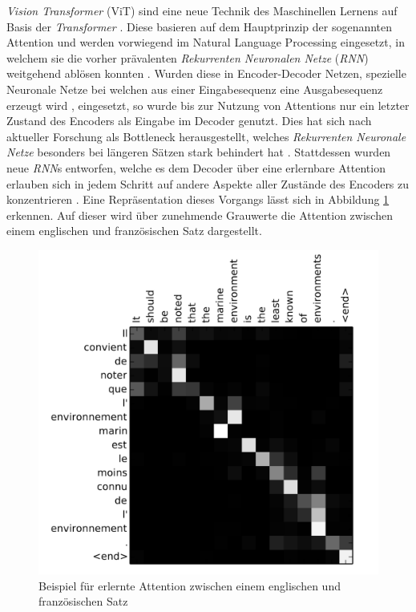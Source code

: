 \documentclass[twoside,a4paper]{IEEEtran}
\begin{document}
\emph{Vision Transformer} (ViT) sind eine neue Technik des Maschinellen Lernens auf Basis der \emph{Transformer} \cite{TRANSFORMERS}. Diese basieren auf dem Hauptprinzip der sogenannten Attention und werden vorwiegend im Natural Language Processing eingesetzt, in welchem sie die vorher prävalenten \emph{Rekurrenten Neuronalen Netze} (\emph{RNN}) weitgehend ablösen konnten \cite{TRANSFORMERS}. Wurden diese in Encoder-Decoder Netzen, spezielle Neuronale Netze bei welchen aus einer Eingabesequenz eine Ausgabesequenz erzeugt wird \cite[S.388-389]{MACHINE_LEARNING}, eingesetzt, so wurde bis zur Nutzung von Attentions nur ein letzter Zustand des Encoders als Eingabe im Decoder genutzt. Dies hat sich nach aktueller Forschung als Bottleneck herausgestellt, welches \emph{Rekurrenten Neuronale Netze} besonders bei längeren Sätzen stark behindert hat \cite[S.2]{TRANSFORMERS}. Stattdessen wurden neue \emph{RNN}s entworfen, welche es dem Decoder über eine erlernbare Attention erlauben sich in jedem Schritt auf andere Aspekte aller Zustände des Encoders zu konzentrieren \cite[S.4]{RNN_ATTENTION}. Eine Repräsentation dieses Vorgangs lässt sich in Abbildung \ref{bildAttention} erkennen. Auf dieser wird über zunehmende Grauwerte die Attention zwischen einem englischen und französischen Satz dargestellt.

\begin{figure}[!htb]
	\includegraphics[width=\columnwidth]{attention_visualized}
	\caption{Beispiel für erlernte Attention zwischen einem englischen und französischen Satz \cite[S.6]{RNN_ATTENTION}}
	\label{bildAttention}
\end{figure}
\end{document}
